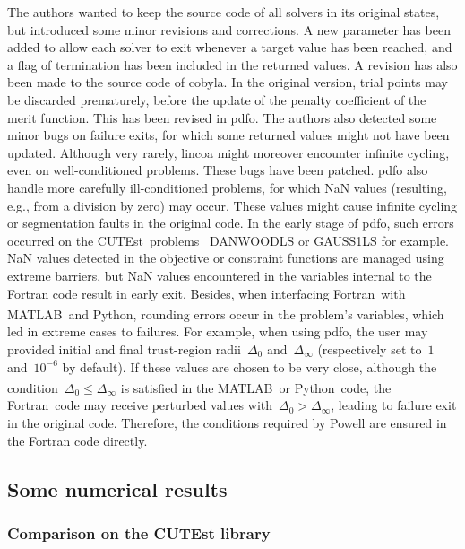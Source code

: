 \documentclass[11pt,draft]{article}
\numberwithin{equation}{section}
\newcommand\trg[1][k]{\Delta_{#1}}
\def\cutest{\mbox{CUTEst}}
\def\fortran{\mbox{Fortran}}
\def\matlab{\mbox{MATLAB\textsuperscript{\textregistered}}}
\def\python{\mbox{Python}}
\begin{document}
The authors wanted to keep the source code of all solvers in its original states, but introduced some minor revisions and corrections.
A new parameter has been added to allow each solver to exit whenever a target value has been reached, and a flag of termination has been included in the returned values.
A revision has also been made to the source code of \gls{cobyla}.
In the original version, trial points may be discarded prematurely, before the update of the penalty coefficient of the merit function.
This has been revised in \gls{pdfo}.
The authors also detected some minor bugs on failure exits, for which some returned values might not have been updated.
Although very rarely, \gls{lincoa} might moreover encounter infinite cycling, even on well-conditioned problems.
These bugs have been patched.
\Gls{pdfo} also handle more carefully ill-conditioned problems, for which NaN values (resulting, e.g., from a division by zero) may occur.
These values might cause infinite cycling or segmentation faults in the original code.
In the early stage of \gls{pdfo}, such errors occurred on the \cutest\ problems~\cite{Gould_Orban_Toint_2015} DANWOODLS or GAUSS1LS for example.
NaN values detected in the objective or constraint functions are managed using extreme barriers, but NaN values encountered in the variables internal to the Fortran code result in early exit.
Besides, when interfacing \fortran\ with \matlab\ and \python, rounding errors occur in the problem's variables, which led in extreme cases to failures.
For example, when using \gls{pdfo}, the user may provided initial and final trust-region radii~$\trg[0]$ and~$\trg[\infty]$ (respectively set to~$1$ and~$10^{-6}$ by default).
If these values are chosen to be very close, although the condition~$\trg[0] \le \trg[\infty]$ is satisfied in the \matlab\ or \python\ code, the \fortran\ code may receive perturbed values with~$\trg[0] > \trg[\infty]$, leading to failure exit in the original code.
Therefore, the conditions required by Powell are ensured in the Fortran code directly.

\subsection{Some numerical results}

\subsubsection{Comparison on the CUTEst library}
\end{document}

